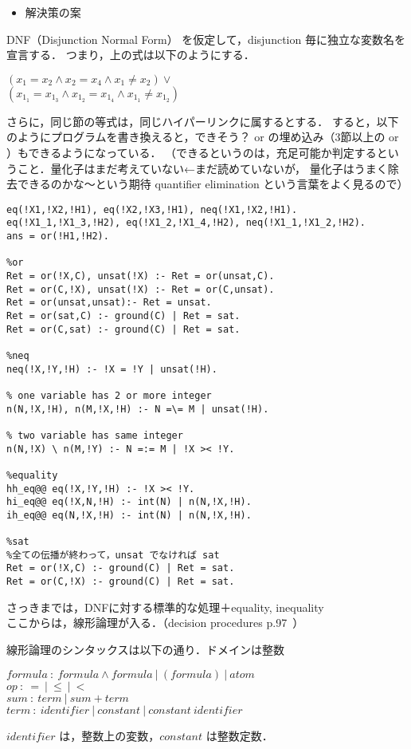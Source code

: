 \begin{itemize}
    \item 解決策の案
\end{itemize}
DNF（Disjunction Normal Form） を仮定して，disjunction 毎に独立な変数名を宣言する．
つまり，上の式は以下のようにする．
\begin{center}
    $(x_1 = x_2 \wedge x_2 = x_4 \wedge x_1 \neq x_2) \vee$\\
    $(x_{1_1} = x_{1_3} \wedge x_{1_2} = x_{1_4} \wedge x_{1_1} \neq x_{1_2})$
\end{center}
さらに，同じ節の等式は，同じハイパーリンクに属するとする．
すると，以下のようにプログラムを書き換えると，できそう？
or の埋め込み（3節以上の or ）もできるようになっている．
（できるというのは，充足可能か判定するということ．量化子はまだ考えていない←まだ読めていないが，
量化子はうまく除去できるのかな～という期待 quantifier elimination という言葉をよく見るので）
\begin{lstlisting}
eq(!X1,!X2,!H1), eq(!X2,!X3,!H1), neq(!X1,!X2,!H1).
eq(!X1_1,!X1_3,!H2), eq(!X1_2,!X1_4,!H2), neq(!X1_1,!X1_2,!H2).
ans = or(!H1,!H2).

%or
Ret = or(!X,C), unsat(!X) :- Ret = or(unsat,C).
Ret = or(C,!X), unsat(!X) :- Ret = or(C,unsat).
Ret = or(unsat,unsat):- Ret = unsat.
Ret = or(sat,C) :- ground(C) | Ret = sat.
Ret = or(C,sat) :- ground(C) | Ret = sat.

%neq
neq(!X,!Y,!H) :- !X = !Y | unsat(!H).

% one variable has 2 or more integer
n(N,!X,!H), n(M,!X,!H) :- N =\= M | unsat(!H).

% two variable has same integer
n(N,!X) \ n(M,!Y) :- N =:= M | !X >< !Y.

%equality
hh_eq@@ eq(!X,!Y,!H) :- !X >< !Y.
hi_eq@@ eq(!X,N,!H) :- int(N) | n(N,!X,!H).
ih_eq@@ eq(N,!X,!H) :- int(N) | n(N,!X,!H).

%sat
%全ての伝播が終わって，unsat でなければ sat
Ret = or(!X,C) :- ground(C) | Ret = sat.
Ret = or(C,!X) :- ground(C) | Ret = sat.
\end{lstlisting}

さっきまでは，DNFに対する標準的な処理＋equality, inequality\\
ここからは，線形論理が入る．（decision procedures p.97~）

線形論理のシンタックスは以下の通り．ドメインは整数
\begin{center}
    $formula\: :\: formula\wedge formula \:|\: (formula) \:|\: atom$\\
    $op \::\: = \:|\: \leq \:|\: <$\\
    $sum \::\: term \:|\: sum+term$\\
    $term \::\: identifier \:|\: constant \:|\: constant \: identifier$
\end{center}
$identifier$ は，整数上の変数，$constant$ は整数定数．

